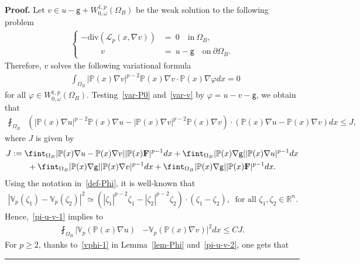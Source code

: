\documentclass[a4paper, 11pt]{article}
\newenvironment{proof}[1][Proof]{\textbf{#1.} }{\hfill\rule{0.5em}{0.5em}}
\begin{document}
\begin{proof}
Let $v \in u - \mathsf{g} + W^{1,p}_{0,\omega}(\Omega_B)$ be the weak solution to the following problem  
\begin{align}\label{Eq-v}
\begin{cases}
-\mathrm{div}\left(\mathcal{L}_p(x,\nabla v)\right) & = \ 0  \quad \mbox{in} \ \Omega_B,\\
\hspace{1cm} v &  = \ u - \mathsf{g}  \quad \mbox{on} \ \partial \Omega_B.\end{cases}
\end{align}
Therefore, $v$ solves the following variational formula
\begin{align}\label{var-v}
& \int_{\Omega_B} |\mathbb{P}(x)\nabla v|^{p-2}\mathbb{P}(x)\nabla v \cdot  \mathbb{P}(x)\nabla\varphi dx  =  0
\end{align}
for all $\varphi \in W^{1,p}_{0,\omega}(\Omega_B)$. Testing~\eqref{var-P0} and~\eqref{var-v} by $\varphi = u - v - \mathsf{g}$, we obtain that
\begin{align}
\fint_{\Omega_B} & \left(|\mathbb{P}(x)\nabla u|^{p-2}\mathbb{P}(x)\nabla u - |\mathbb{P}(x)\nabla v|^{p-2}\mathbb{P}(x)\nabla v\right) \cdot \left(\mathbb{P}(x)\nabla u - \mathbb{P}(x) \nabla v\right)  dx \le J, \label{pi-u-v-1}
\end{align}
where $J$ is given by
\begin{align*}
J & := \fint_{\Omega_B} |\mathbb{P}(x)\nabla u - \mathbb{P}(x) \nabla v| |\mathbb{P}(x)\mathbf{F}|^{p-1}  dx + \fint_{\Omega_B} |\mathbb{P}(x)\nabla \mathsf{g}| |\mathbb{P}(x)\nabla u|^{p-1}  dx \notag \\
& \qquad  + \fint_{\Omega_B} |\mathbb{P}(x)\nabla \mathsf{g}| |\mathbb{P}(x)\nabla v|^{p-1}  dx + \fint_{\Omega_B} |\mathbb{P}(x)\nabla \mathsf{g}| |\mathbb{P}(x)\mathbf{F}|^{p-1}  dx.
\end{align*}
Using the notation in~\eqref{def-Phi}, it is well-known that
\begin{align*}
|\mathbb{V}_{p}(\zeta_1)-\mathbb{V}_{p}(\zeta_2)|^2 \simeq \left(|\zeta_1|^{p-2}\zeta_1 - |\zeta_2|^{p-2}\zeta_2\right) \cdot (\zeta_1-\zeta_2), \ \mbox{ for all } \zeta_1, \zeta_2 \in \mathbb{R}^n.
\end{align*}
Hence,~\eqref{pi-u-v-1} implies to
\begin{align}\label{pi-u-v-2}
\fint_{\Omega_B} |\mathbb{V}_{p}(\mathbb{P}(x) \nabla u) & - \mathbb{V}_{p}(\mathbb{P}(x) \nabla v)|^2 dx \le CJ.
\end{align}
For $p \ge 2$, thanks to~\eqref{vphi-1} in Lemma~\ref{lem-Phi} and~\eqref{pi-u-v-2}, one gets that

\end{proof}
\end{document}
